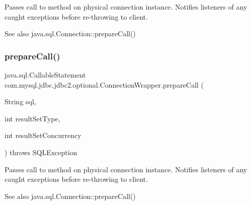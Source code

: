 Passes call to method on physical connection instance. Notifies listeners of any caught exceptions before re-\/throwing to client.

\begin{DoxySeeAlso}{See also}
java.\+sql.\+Connection\+::prepare\+Call() 
\end{DoxySeeAlso}
\mbox{\label{classcom_1_1mysql_1_1jdbc_1_1jdbc2_1_1optional_1_1_connection_wrapper_ab4b7714e34588d9bd35965b104481ff0}} 
\subsubsection{\texorpdfstring{prepare\+Call()}{prepareCall()}\hspace{0.1cm}{\footnotesize\ttfamily [2/3]}}
{\footnotesize\ttfamily java.\+sql.\+Callable\+Statement com.\+mysql.\+jdbc.\+jdbc2.\+optional.\+Connection\+Wrapper.\+prepare\+Call (\begin{DoxyParamCaption}\item[{String}]{sql,  }\item[{int}]{result\+Set\+Type,  }\item[{int}]{result\+Set\+Concurrency }\end{DoxyParamCaption}) throws S\+Q\+L\+Exception}

Passes call to method on physical connection instance. Notifies listeners of any caught exceptions before re-\/throwing to client.

\begin{DoxySeeAlso}{See also}
java.\+sql.\+Connection\+::prepare\+Call() 
\end{DoxySeeAlso}
\mbox{\label{classcom_1_1mysql_1_1jdbc_1_1jdbc2_1_1optional_1_1_connection_wrapper_a05befb9e457e44fc14ae4133068b8a85}} 
